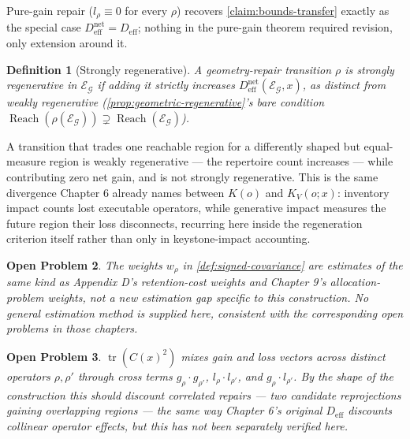 \documentclass[12pt]{report}
\newtheorem{definition}{Definition}[section]
\newtheorem{openproblem}[definition]{Open Problem}
\newcommand{\Reach}{\ensuremath{\operatorname{Reach}}}
\begin{document}
Pure-gain repair ($l_\rho \equiv 0$ for every $\rho$) recovers
\cref{claim:bounds-transfer} exactly as the special case
$D_{\mathrm{eff}}^{\mathrm{net}} = D_{\mathrm{eff}}$; nothing in the
pure-gain theorem required revision, only extension around it.

\begin{definition}[Strongly regenerative]
\label{def:strongly-regenerative}
A geometry-repair transition $\rho$ is \emph{strongly regenerative} in
$\mathcal{E}_\mathcal{G}$ if adding it strictly increases
$D_{\mathrm{eff}}^{\mathrm{net}}(\mathcal{E}_\mathcal{G},x)$, as
distinct from \emph{weakly regenerative} (\cref{prop:geometric-regenerative}'s
bare condition $\Reach(\rho(\mathcal{E}_\mathcal{G})) \supsetneq
\Reach(\mathcal{E}_\mathcal{G})$).
\end{definition}

A transition that trades one reachable region for a differently shaped
but equal-measure region is weakly regenerative --- the repertoire
count increases --- while contributing zero net gain, and is not
strongly regenerative. This is the same divergence Chapter 6 already
names between $K(o)$ and $K_V(o;x)$: inventory impact counts lost
executable operators, while generative impact measures the future
region their loss disconnects, recurring here inside the regeneration
criterion itself rather than only in keystone-impact accounting.

\begin{openproblem}
\label{prob:weights-recur}
The weights $w_\rho$ in \cref{def:signed-covariance} are estimates of
the same kind as Appendix D's retention-cost weights and Chapter 9's
allocation-problem weights, not a new estimation gap specific to this
construction. No general estimation method is supplied here, consistent
with the corresponding open problems in those chapters.
\end{openproblem}

\begin{openproblem}
\label{prob:cross-terms}
$\operatorname{tr}(C(x)^2)$ mixes gain and loss vectors across distinct
operators $\rho, \rho'$ through cross terms $g_\rho \cdot g_{\rho'}$,
$l_\rho \cdot l_{\rho'}$, and $g_\rho \cdot l_{\rho'}$. By the shape of
the construction this should discount correlated repairs --- two
candidate reprojections gaining overlapping regions --- the same way
Chapter 6's original $D_{\mathrm{eff}}$ discounts collinear operator
effects, but this has not been separately verified here.
\end{openproblem}
\end{document}
